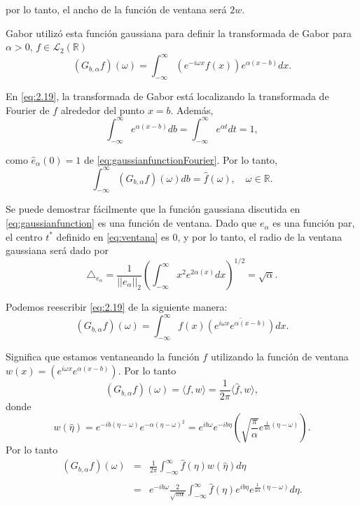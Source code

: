 \begin{multicols}{2}
por lo tanto, el ancho de la función de ventana será $2w$.

Gabor utilizó esta función gaussiana para definir la transformada de Gabor para $\alpha > 0$, $f \in \mathcal{L}_2(\mathbb{R})$
\begin{equation}
(G_{b,\alpha} f)(\omega) = \int_{-\infty}^{\infty} (e^{-i\omega x} f(x)) e^{\alpha(x - b)} dx. 
\label{eq:2.19}
\end{equation}

En \ref{eq:2.19}, la transformada de Gabor está localizando la transformada de Fourier de $f$ alrededor del punto $x = b$. Además,
\begin{equation}
    \int_{-\infty}^{\infty} e^{\alpha(x - b)} db = \int_{-\infty}^{\infty} e^{\alpha t} dt = 1,
\label{eq:propiedadGabor}
\end{equation}

como $\hat{e}_{\alpha}(0) = 1$ de \ref{eq:gaussianfunctionFourier}. Por lo tanto,
\begin{equation}
\int_{-\infty}^{\infty} (G_{b,\alpha} f)(\omega) db = \hat{f}(\omega), \quad \omega \in \mathbb{R}. 
\end{equation}

Se puede demostrar fácilmente que la función gaussiana discutida en \ref{eq:gaussianfunction} es una función de ventana. Dado que $e_{\alpha}$ es una función par, el centro $t^*$ definido en \ref{eq:ventana} es $0$, y por lo tanto, el radio de la ventana gaussiana será dado por
$$\triangle_{e_{\alpha}} = \frac{1}{||e_{\alpha}||_2} \left( \int_{-\infty}^{\infty} x^2 e^{2\alpha(x)} dx \right)^{1/2} = \sqrt{\alpha}.$$

Podemos reescribir \ref{eq:2.19} de la siguiente manera:
$$(G_{b,\alpha} f)(\omega) = \int_{-\infty}^{\infty} f(x) \overline{(e^{i\omega x} e^{\alpha(x - b)})} dx.$$

Significa que estamos ventaneando la función $f$ utilizando la función de ventana $w(x) = (e^{i\omega x} e^{\alpha(x - b)})$. Por lo tanto
\begin{equation}
(G_{b,\alpha} f)(\omega) = \langle f,w \rangle = \frac{1}{2\pi} \langle \hat{f}, w \rangle,
\label{eq:2.22}
\end{equation}
donde 
$$w(\hat{\eta}) = e^{-ib(\eta-\omega)} e^{-\alpha(\eta-\omega)^2} = e^{ib\omega} e^{-ib\eta} \left( \sqrt{\frac{\pi}{\alpha}} e^{\frac{1}{4\alpha}(\eta - \omega)} \right).$$ 
Por lo tanto
\begin{equation}
    \begin{array}{rcl}
	(G_{b,\alpha} f)(\omega) &=& \displaystyle\frac{1}{2\pi} \int_{-\infty}^{\infty} \hat{f}(\eta) w(\hat{\eta}) d\eta\\\\
			     &=&\displaystyle e^{-ib\omega} \frac{2}{\sqrt{\pi \alpha}} \int_{-\infty}^{\infty} \hat{f}(\eta) e^{ib\eta} e^{\frac{1}{4\alpha}(\eta - \omega)} d\eta.
    \end{array}
\label{eq:2.23}
\end{equation}


\end{multicols}
